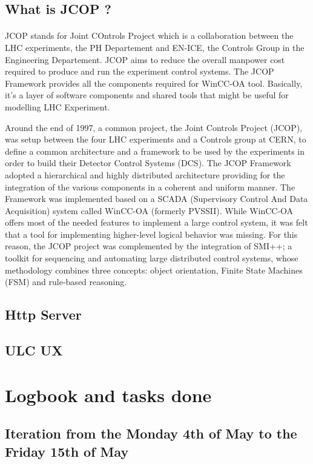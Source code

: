 \documentclass[a4paper, 10pt]{article}
\begin{document}
\subsection{What is JCOP ?}
\paragraph{}
JCOP stands for Joint COntrols Project which is a collaboration between the LHC experiments, the PH Departement and EN-ICE, the Controls Group in the Engineering Departement. 
JCOP aims to reduce the overall manpower cost required to produce and run the experiment control systems.
The JCOP Framework provides all the components required for WinCC-OA tool. 
Basically, it's a layer of software components and shared tools that might be useful for modelling LHC Experiment.

Around the end of 1997, a common project, the Joint Controls Project (JCOP), was setup between the four LHC experiments and a Controls group at CERN, to define a common architecture and a framework to be used by the experiments in order to build their Detector Control Systems (DCS).
The JCOP Framework adopted a hierarchical and highly distributed architecture providing for the integration of the various components in a coherent and uniform manner. 
The Framework was implemented based on a SCADA (Supervisory Control And Data Acquisition) system called WinCC-OA (formerly PVSSII). 
While WinCC-OA offers most of the needed features to implement a large control system, it was felt that a tool for implementing higher-level logical behavior was missing.
For this reason, the JCOP project was complemented by the integration of SMI++; a toolkit for sequencing and automating large distributed control systems, whose methodology combines three concepts: object orientation, Finite State Machines (FSM) and rule-based reasoning.

\subsection{Http Server}
\subsection{ULC UX}

\section{Logbook and tasks done}
\subsection{Iteration from the Monday 4th of May to the Friday 15th of May}
\end{document}
